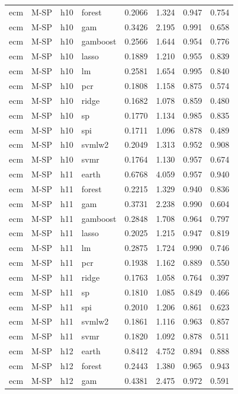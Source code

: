 \begin{ThreePartTable}
\begin{longtable}[t]{llclcccc}
ecm & M-SP & h10 & forest & 0.2066 & 1.324 & 0.947 & 0.754\\
ecm & M-SP & h10 & gam & 0.3426 & 2.195 & 0.991 & 0.658\\
ecm & M-SP & h10 & gamboost & 0.2566 & 1.644 & 0.954 & 0.776\\
ecm & M-SP & h10 & lasso & 0.1889 & 1.210 & 0.955 & 0.839\\
ecm & M-SP & h10 & lm & 0.2581 & 1.654 & 0.995 & 0.840\\
ecm & M-SP & h10 & pcr & 0.1808 & 1.158 & 0.875 & 0.574\\
ecm & M-SP & h10 & ridge & 0.1682 & 1.078 & 0.859 & 0.480\\
ecm & M-SP & h10 & sp & 0.1770 & 1.134 & 0.985 & 0.835\\
ecm & M-SP & h10 & spi & 0.1711 & 1.096 & 0.878 & 0.489\\
ecm & M-SP & h10 & svmlw2 & 0.2049 & 1.313 & 0.952 & 0.908\\
ecm & M-SP & h10 & svmr & 0.1764 & 1.130 & 0.957 & 0.674\\
\addlinespace
ecm & M-SP & h11 & earth & 0.6768 & 4.059 & 0.957 & 0.940\\
ecm & M-SP & h11 & forest & 0.2215 & 1.329 & 0.940 & 0.836\\
ecm & M-SP & h11 & gam & 0.3731 & 2.238 & 0.990 & 0.604\\
ecm & M-SP & h11 & gamboost & 0.2848 & 1.708 & 0.964 & 0.797\\
ecm & M-SP & h11 & lasso & 0.2025 & 1.215 & 0.947 & 0.819\\
ecm & M-SP & h11 & lm & 0.2875 & 1.724 & 0.990 & 0.746\\
ecm & M-SP & h11 & pcr & 0.1938 & 1.162 & 0.889 & 0.550\\
ecm & M-SP & h11 & ridge & 0.1763 & 1.058 & 0.764 & 0.397\\
ecm & M-SP & h11 & sp & 0.1810 & 1.085 & 0.849 & 0.466\\
ecm & M-SP & h11 & spi & 0.2010 & 1.206 & 0.861 & 0.623\\
ecm & M-SP & h11 & svmlw2 & 0.1861 & 1.116 & 0.963 & 0.857\\
ecm & M-SP & h11 & svmr & 0.1820 & 1.092 & 0.878 & 0.511\\
\addlinespace
ecm & M-SP & h12 & earth & 0.8412 & 4.752 & 0.894 & 0.888\\
ecm & M-SP & h12 & forest & 0.2443 & 1.380 & 0.965 & 0.943\\
ecm & M-SP & h12 & gam & 0.4381 & 2.475 & 0.972 & 0.591\\

\end{longtable}
\end{ThreePartTable}
